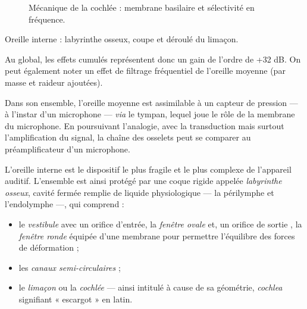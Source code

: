 \begin{marginfigure}
\begin{subfigure}{\linewidth}
\caption{\label{fig:V.16d}Mécanique de la cochlée : membrane basilaire et sélectivité en fréquence.}
\end{subfigure}
\caption{\label{fig:V.16}Oreille interne : labyrinthe osseux, coupe et déroulé du limaçon.}
\end{marginfigure}

Au global, les effets cumulés représentent donc un gain de l'ordre de +32 dB. On peut également noter un effet de filtrage fréquentiel de l'oreille moyenne (par masse et raideur ajoutées).

Dans son ensemble, l'oreille moyenne est assimilable à un capteur de pression --- à l'instar d'un microphone --- \textit{via} le tympan, lequel joue le rôle de la membrane du microphone. En poursuivant l'analogie, avec la transduction mais surtout l'amplification du signal, la chaîne des osselets peut se comparer au préamplificateur d'un microphone.


L'oreille interne est le dispositif le plus fragile et le plus complexe de l'appareil auditif. L'ensemble est ainsi protégé par une coque rigide appelée \emph{labyrinthe osseux}, cavité fermée remplie de liquide physiologique --- la périlymphe et l'endolymphe ---,
qui comprend :
\begin{itemize}
\item le \emph{vestibule} avec un orifice d'entrée, la \emph{fenêtre ovale} et, un orifice de \og sortie \fg, la \emph{fenêtre ronde} équipée d'une membrane pour permettre l'équilibre des forces de déformation ;
\item les \emph{canaux semi-circulaires} ;
\item le \emph{limaçon} ou la \emph{cochlée} --- ainsi intitulé à cause de sa géométrie, \textit{cochlea} signifiant « escargot » en latin.
\end{itemize}




